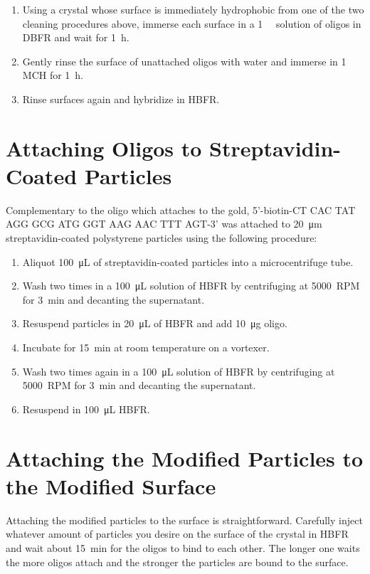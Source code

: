 \documentclass[a4paper]{article}
\begin{document}
\begin{enumerate}
  \item Using a crystal whose surface is immediately hydrophobic from one of
        the two cleaning procedures above, immerse each surface in a
        \SI{1}{\micro\Molar} solution of oligos in DBFR and wait for
        \SI{1}{\hour}.
  \item Gently rinse the surface of unattached oligos with water and immerse
        in \SI{1}{\milli\Molar} MCH for \SI{1}{\hour}.
  \item Rinse surfaces again and hybridize in HBFR\@.
\end{enumerate}

\section{Attaching Oligos to Streptavidin-Coated Particles}
Complementary to the oligo which attaches to the gold,
5'-biotin-CT CAC TAT AGG GCG ATG GGT AAG AAC TTT AGT-3' was attached to
\SI{20}{\micro\meter} streptavidin-coated polystyrene particles using the
following procedure:
\begin{enumerate}
  \item Aliquot \SI{100}{\micro\liter} of streptavidin-coated particles into
        a microcentrifuge tube.
  \item Wash two times in a \SI{100}{\micro\liter} solution of HBFR by
        centrifuging at \SI{5000}{RPM} for \SI{3}{\minute} and decanting the
        supernatant.
  \item Resuspend particles in \SI{20}{\micro\liter} of HBFR and add
        \SI{10}{\micro\gram} oligo.
  \item Incubate for \SI{15}{\minute} at room temperature on a vortexer.
  \item Wash two times again in a \SI{100}{\micro\liter} solution of HBFR by
        centrifuging at \SI{5000}{RPM} for \SI{3}{\minute} and decanting the
        supernatant.
  \item Resuspend in \SI{100}{\micro\liter} HBFR\@.
\end{enumerate}

\section{Attaching the Modified Particles to the Modified Surface}
Attaching the modified particles to the surface is straightforward.
Carefully inject whatever amount of particles you desire on the surface of
the crystal in HBFR and wait about \SI{15}{\minute} for the oligos to bind
to each other.  The longer one waits the more oligos attach and the
stronger the particles are bound to the surface.
\end{document}
